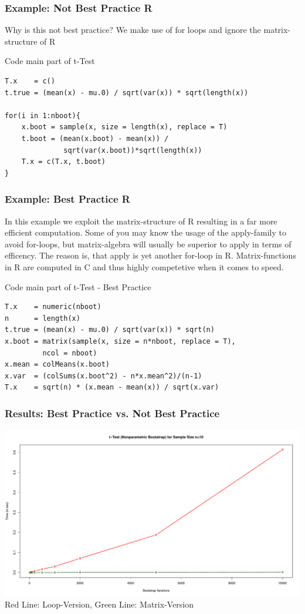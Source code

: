 \documentclass[9pt, dvipsnames]{beamer} %
\begin{document}
    \begin{frame}[fragile]
    	\frametitle{\textbf{Example: Not Best Practice R}}
    	Why is this not best practice? We make use of for loops and ignore the matrix-structure of R
    	\begin{block}{Code main part of t-Test}
    	\begin{verbatim}
T.x    = c()
t.true = (mean(x) - mu.0) / sqrt(var(x)) * sqrt(length(x))

for(i in 1:nboot){
    x.boot = sample(x, size = length(x), replace = T)
    t.boot = (mean(x.boot) - mean(x)) /
              sqrt(var(x.boot))*sqrt(length(x))
    T.x = c(T.x, t.boot)
}
    	\end{verbatim}
    	\end{block}
    \end{frame}
    \begin{frame}[fragile]
    	\frametitle{\textbf{Example: Best Practice R}}
    	In this example we exploit the matrix-structure of R resulting in a far more efficient computation. Some of you may know the usage of the apply-family to avoid for-loops, but matrix-algebra will usually be superior to apply in terms of efficency. The reason is, that apply is yet another for-loop in R. Matrix-functions in R are computed in C and thus highly competetive when it comes to speed.
		\begin{block}{Code main part of t-Test - Best Practice}
    	\begin{verbatim}
T.x    = numeric(nboot)
n      = length(x)
t.true = (mean(x) - mu.0) / sqrt(var(x)) * sqrt(n)
x.boot = matrix(sample(x, size = n*nboot, replace = T),
         ncol = nboot)
x.mean = colMeans(x.boot)
x.var  = (colSums(x.boot^2) - n*x.mean^2)/(n-1)
T.x    = sqrt(n) * (x.mean - mean(x)) / sqrt(x.var)
    	\end{verbatim}
		\end{block}
    \end{frame}
   	\begin{frame}
    	\frametitle{\textbf{Results: Best Practice vs. Not Best Practice}}
    	\includegraphics[scale=0.3]{time1}
    	Red Line: Loop-Version, Green Line: Matrix-Version
   	\end{frame}
\end{document}
